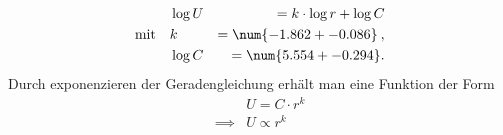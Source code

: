 \begin{align*}
                     & \log{U} & = k \cdot \log{r} + \log{C} \\
    \text{mit} \quad & k       & = \num{-1.862 +- 0.086} \:, \\
                     & \log{C} & = \num{5.554 +- 0.294} .
\end{align*}
Durch exponenzieren der Geradengleichung erhält man eine Funktion der Form
\begin{align*}
             & U = C \cdot r^k \\
    \implies & U \propto r^k
\end{align*}